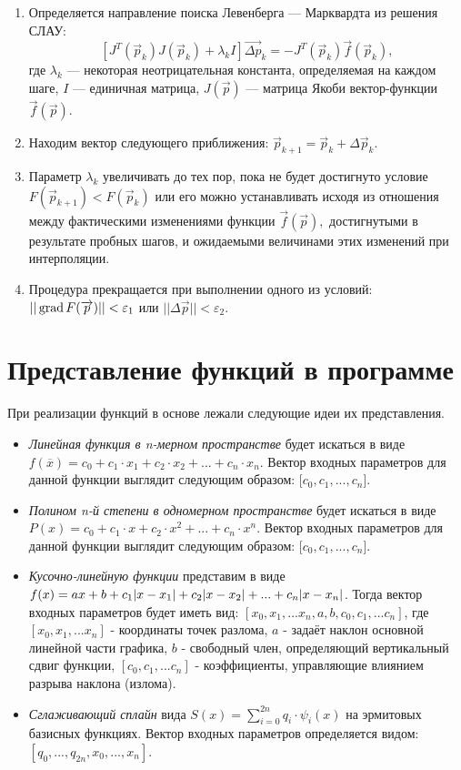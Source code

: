 \begin{enumerate}
	\item Определяется направление поиска Левенберга — Марквардта  из решения СЛАУ: 
	$$[J^{T}({\vec {p}}_{k})J({\vec {p}}_{k})+\lambda _{k}I]{\vec {\Delta p}}_{k}=-J^{T}({\vec {p}}_{k}){\vec {f}}({\vec {p}}_{k}),$$
	где $\lambda _{k}$ — некоторая неотрицательная константа, определяемая на каждом шаге, $I$ — единичная матрица, $J({\vec {p}})$ — матрица Якоби вектор-функции ${\vec {f}}({\vec {p}})$. 
	\item Находим вектор следующего приближения: $\vec {p}_{k+1}={\vec {p}}_{k}+{\Delta \vec {p}}_{k}.$
	\item Параметр $\lambda _{k}$  увеличивать до тех пор, пока не будет достигнуто условие $F({\vec {p}}_{k+1})<F({\vec {p}}_{k})$ или его можно устанавливать исходя из отношения между фактическими изменениями функции ${\vec {f}}({\vec {p}}),$ достигнутыми в результате пробных шагов, и ожидаемыми величинами этих изменений при интерполяции.
	\item Процедура прекращается при выполнении одного из условий: $|| \, \mathrm{grad} \, F(\overrightarrow{p})|| < \varepsilon_1$ или $|| \Delta \overrightarrow{p}|| < \varepsilon_2$.
\end{enumerate}



\section{Представление функций в программе}

При реализации функций в основе лежали следующие идеи их представления.

\begin{itemize}
	\item \textsl{Линейная функция в n-мерном пространстве} будет искаться в виде $f(\overline{x}) = c_0 + c_1 \cdot x_1 + c_2 \cdot x_2 + ... + c_n \cdot x_n$. Вектор входных параметров для данной функции выглядит следующим образом: [$c_0, c_1, ..., c_n$].
	\item \textsl{Полином n-й степени в одномерном пространстве} будет искаться в виде $P(x) = c_0 + c_1 \cdot x + c_2 \cdot x^2 + ... + c_n \cdot x^n$. Вектор входных параметров для данной функции выглядит следующим образом: [$c_0, c_1, ..., c_n$].
	\item \textsl{Кусочно-линейную функции} представим в виде $f(x) = ax + b + c_1 \abs{x - x_1} + c_2 \abs{x - x_2} + ... + c_n \abs{x - x_n}$. Тогда вектор входных параметров будет иметь вид: $[x_0, x_1, ... x_n, a, b, c_0, c_1, ... c_n]$, где $[x_0, x_1, ... x_n]$ - координаты точек разлома, $a$ - задаёт наклон основной линейной части графика, $b$ - свободный член, определяющий вертикальный сдвиг функции, $[c_0, c_1, ... c_n]$ - коэффициенты, управляющие влиянием разрыва наклона (излома).
	\item \textsl{Сглаживающий сплайн} вида $S(x) = \sum_{i = 0}^{2n} q_i \cdot \psi_i(x)$ на эрмитовых базисных функциях. Вектор входных параметров определяется видом: $[q_0, ..., q_{2n}, x_0, ..., x_n]$.
\end{itemize}